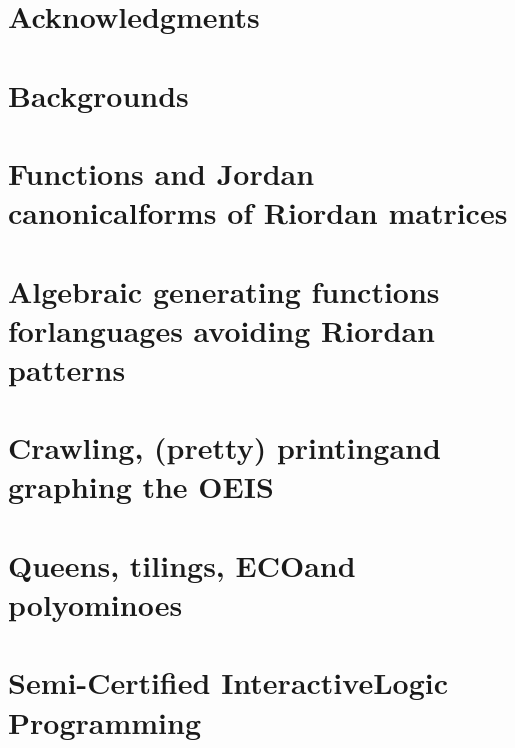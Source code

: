 \documentclass[a4paper,10pt]{tufte-book}
\begin{document}
\cleardoublepage

\chapter*{Acknowledgments}

\cleardoublepage



\cleardoublepage

\chapter{Backgrounds}
\label{ch:backgrounds}



\chapter{Functions and Jordan canonical\newline forms of Riordan matrices}
\label{ch:Riordan-matrices-function}



\chapter{Algebraic generating functions for\newline languages avoiding Riordan patterns}
\label{ch:algebraic-gfs-languages-avoiding-Riordan-patterns}



\chapter{Crawling, (pretty) printing\newline and graphing the OEIS}
\label{ch:OEIS:tools}



\chapter{Queens, tilings, ECO\newline and polyominoes}
\label{ch:queens-tilings-polyominoes}



\chapter{Semi-Certified Interactive\newline Logic Programming}
\label{ch:scilp}
\end{document}
